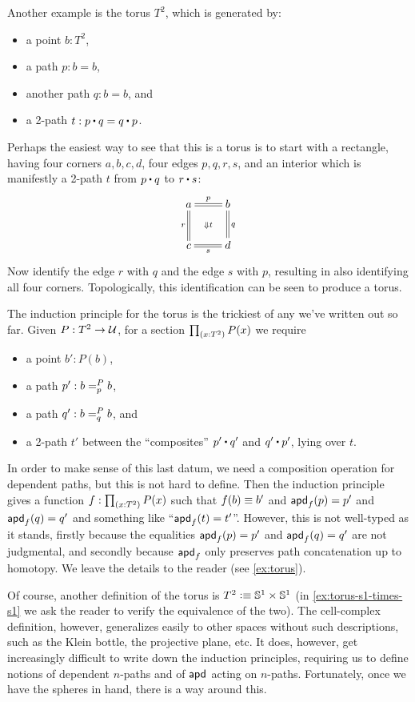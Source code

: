 %
Another example is the torus $T^2$, which is generated by:
\begin{itemize}
\item a point $b:T^2$,
\item a path $p:b=b$,
\item another path $q:b=b$, and
\item a 2-path $t: p\ct q = q \ct p$.
\end{itemize}
Perhaps the easiest way to see that this is a torus is to start with a rectangle, having four corners $a,b,c,d$, four edges $p,q,r,s$, and an interior which is manifestly a 2-path $t$ from $p\ct q$ to $r\ct s$:
\begin{equation*}
  \vcenter{\xymatrix{
      a\ar@{=}[r]^p\ar@{=}[d]_r \ar@{}[dr]|{\Downarrow t} &
      b\ar@{=}[d]^q\\
      c\ar@{=}[r]_s &
      d
      }}
\end{equation*}
Now identify the edge $r$ with $q$ and the edge $s$ with $p$, resulting in also identifying all four corners.
Topologically, this identification can be seen to produce a torus.

%
%
The induction principle for the torus is the trickiest of any we've written out so far.
Given $P:T^2\to\type$, for a section $\prd{x:T^2} P(x)$ we require
\begin{itemize}
\item a point $b':P(b)$,
\item a path $p' : \dpath P p b b$,
\item a path $q' : \dpath P q b b$, and
\item a 2-path $t'$ between the ``composites'' $p'\ct q'$ and $q'\ct p'$, lying over $t$.
\end{itemize}
In order to make sense of this last datum, we need a composition operation for dependent paths, but this is not hard to define.
Then the induction principle gives a function $f:\prd{x:T^2} P(x)$ such that $f(b)\jdeq b'$ and $\apd f {p} = p'$ and $\apd f {q} = q'$ and something like ``$\apd f t = t'$''.
However, this is not well-typed as it stands, firstly because the equalities $\apd f {p} = p'$ and $\apd f {q} = q'$ are not judgmental, and secondly because $\apdfunc f$ only preserves path concatenation up to homotopy.
We leave the details to the reader (see \autoref{ex:torus}).

Of course, another definition of the torus is $T^2 \defeq \Sn^1 \times \Sn^1$ (in \autoref{ex:torus-s1-times-s1} we ask the reader to verify the equivalence of the two).
%
%
The cell-complex definition, however, generalizes easily to other spaces without such descriptions, such as the Klein bottle, the projective plane, etc.
It does, however, get increasingly difficult to write down the induction principles, requiring us to define notions of dependent $n$-paths and of $\apdfunc{}$ acting on $n$-paths.
Fortunately, once we have the spheres in hand, there is a way around this.

